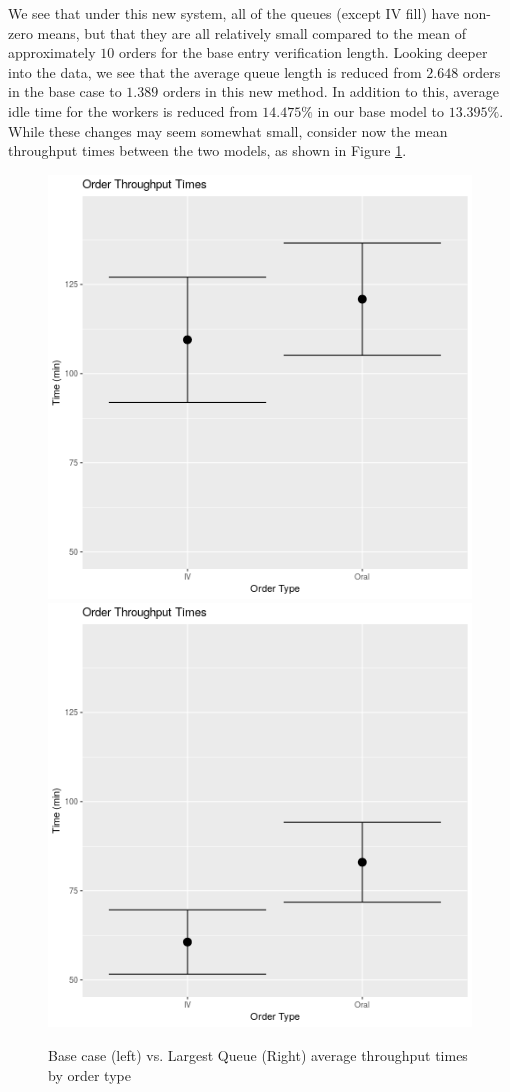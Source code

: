 \documentclass[10pt]{report}            %
\begin{document}
We see that under this new system, all of the queues (except IV fill) have non-zero means, but that they are all relatively small compared to the mean of approximately $10$ orders for the base entry verification length. Looking deeper into the data, we see that the average queue length is reduced from $2.648$ orders in the base case to $1.389$ orders in this new method. In addition to this, average idle time for the workers is reduced from $14.475\%$ in our base model to $13.395\%$. While these changes may seem somewhat small, consider now the mean throughput times between the two models, as shown in Figure \ref{fig:basevlongthrough}.
\begin{figure}[H]
\centering
\includegraphics[scale=.35]{BaseThroughputCIs.png}
\includegraphics[scale=.35]{LongestThroughputCIs.png}
\caption{Base case (left) vs. Largest Queue (Right) average throughput times by order type}
\label{fig:basevlongthrough}
\end{figure}
\end{document}
